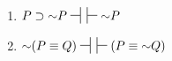 {\begin{enumerate}[label=(\arabic*)]
%
%
%
%

\item $P \eif \enot P \nsststile{}{} \hspace{.5em} \sststile{}{}  \enot P $ %

%
%
%
%
%

\item $\enot (P \eiff Q) \nsststile{}{} \hspace{.5em} \sststile{}{} (P \eiff \enot Q) $ %


\end{enumerate}}

